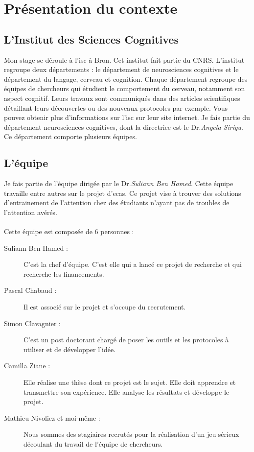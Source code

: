 \section{Présentation du contexte}

\subsection{L'Institut des Sciences Cognitives}

Mon stage se déroule à l'\gls{isc} à Bron. Cet institut fait partie du \gls{CNRS}. L'institut regroupe deux départements : le département de neurosciences cognitives et le département
du langage, cerveau et cognition. Chaque département regroupe des équipes de chercheurs qui étudient le comportement du cerveau, notamment son aspect cognitif. Leurs travaux sont
communiqués dans des articles scientifiques détaillant leurs découvertes ou des nouveaux protocoles par exemple. Vous pouvez obtenir plus d'informations sur l'\gls{isc} sur leur site
internet\cite{ISC00}. Je fais partie du département neurosciences cognitives, dont la directrice est le Dr.\emph{Angela Sirigu}. Ce département comporte plusieurs équipes.

\subsection{L'équipe}Je fais partie de l'équipe dirigée par le Dr.\emph{Suliann Ben Hamed}. Cette équipe travaille entre autres sur le projet d'\gls{ecas}. Ce projet vise à trouver
des solutions d'entrainement de l'attention chez des étudiants n'ayant pas de troubles de l'attention avérés.

\paragraph{}Cette équipe est composée de 6 personnes :
\begin{description}
    \item[Suliann Ben Hamed :] C'est la chef d'équipe. C'est elle qui a lancé ce projet de recherche et qui recherche les financements.
    \item[Pascal Chabaud :] Il est associé sur le projet et s'occupe du recrutement.
    \item[Simon Clavagnier :] C'est un post doctorant chargé de poser les outils et les protocoles à utiliser et de développer l'idée.
    \item[Camilla Ziane :] Elle réalise une thèse dont ce projet est le sujet. Elle doit apprendre et transmettre son expérience. Elle analyse les résultats et développe le projet.
    \item[Mathieu Nivoliez et moi-même :] Nous sommes des stagiaires recrutés pour la réalisation d'un jeu sérieux découlant du travail de l'équipe de chercheurs.\\ \\
\end{description}

